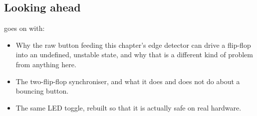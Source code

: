 \subsection*{Looking ahead}
 goes on with:
\begin{itemize}
  \item Why the raw button feeding this chapter's edge detector can drive a flip-flop into an
    undefined, unstable state, and why that is a different kind of problem from anything here.
  \item The two-flip-flop synchroniser, and what it does and does not do about a bouncing button.
  \item The same LED toggle, rebuilt so that it is actually safe on real hardware.
\end{itemize}
